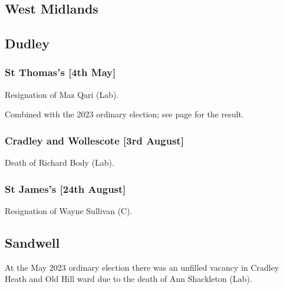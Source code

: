 \documentclass[a4paper,openany]{book}
\begin{document}
\begin{resultsiii}
\section{West Midlands}

\subsection*{Dudley}

\subsubsection*{St Thomas's \hspace*{\fill}\nolinebreak[1]%
	\enspace\hspace*{\fill}
	[4th May]}


Resignation of Maz Qari (Lab).

Combined with the 2023 ordinary election; see page \pageref{DudleySaintThomass} for the result.

\subsubsection*{Cradley and Wollescote \hspace*{\fill}\nolinebreak[1]%
	\enspace\hspace*{\fill}
	[3rd August]}


Death of Richard Body (Lab).

\subsubsection*{St James's \hspace*{\fill}\nolinebreak[1]%
	\enspace\hspace*{\fill}
	[24th August]}


Resignation of Wayne Sullivan (C).

\subsection*{Sandwell}

At the May 2023 ordinary election there was an unfilled vacancy in Cradley Heath and Old Hill ward due to the death of Ann Shackleton (Lab).%


\end{resultsiii}
\end{document}
